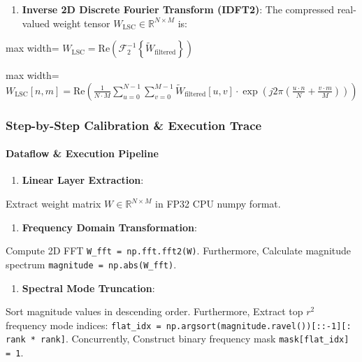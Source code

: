 \begin{enumerate}
\item \textbf{Inverse 2D Discrete Fourier Transform (IDFT2)}:
The compressed real-valued weight tensor $W_{\text{LSC}} \in \mathbb{R}^{N \times M}$ is:
\end{enumerate}
\begin{center}
\begin{adjustbox}{max width=\columnwidth}
$\displaystyle
W_{\text{LSC}} = \text{Re}\left( \mathcal{F}_2^{-1}\left\{ \widetilde{W}_{\text{filtered}} \right\} \right)
$
\end{adjustbox}
\end{center}
\begin{center}
\begin{adjustbox}{max width=\columnwidth}
$\displaystyle
W_{\text{LSC}}[n, m] = \text{Re}\left( \frac{1}{N \cdot M} \sum_{u=0}^{N-1} \sum_{v=0}^{M-1} \widetilde{W}_{\text{filtered}}[u, v] \cdot \exp\left( j 2\pi \left( \frac{u \cdot n}{N} + \frac{v \cdot m}{M} \right) \right) \right)
$
\end{adjustbox}
\end{center}


\subsubsection*{Step-by-Step Calibration \& Execution Trace}

\paragraph{Dataflow \& Execution Pipeline}

\begin{enumerate}
\item \textbf{Linear Layer Extraction}:
\end{enumerate}
Extract weight matrix $W \in \mathbb{R}^{N \times M}$ in FP32 CPU numpy format.

\begin{enumerate}
\item \textbf{Frequency Domain Transformation}:
\end{enumerate}
Compute 2D FFT \texttt{W\_fft = np.fft.fft2(W)}. Furthermore, Calculate magnitude spectrum \texttt{magnitude = np.abs(W\_fft)}.

\begin{enumerate}
\item \textbf{Spectral Mode Truncation}:
\end{enumerate}
Sort magnitude values in descending order. Furthermore, Extract top $r^2$ frequency mode indices: \texttt{flat\_idx = np.argsort(magnitude.ravel())[::-1][: rank * rank]}. Concurrently, Construct binary frequency mask \texttt{mask[flat\_idx] = 1}.

